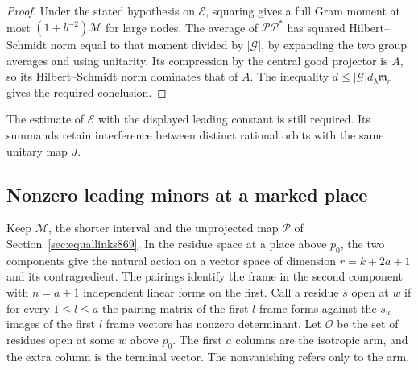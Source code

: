 \documentclass[a4paper,11pt]{article}
\theoremstyle{definition}
\theoremstyle{remark}
\numberwithin{equation}{section}
\begin{document}
\begin{proof}
Under the stated hypothesis on \(\mathcal E\), squaring gives
a full Gram moment at most \((1+b^{-2})\mathcal M\) for large
nodes. The average of \(\mathcal P\mathcal P^*\) has squared
Hilbert--Schmidt norm equal to that moment divided by
\(|\mathcal G|\), by expanding the two group averages and
using unitarity. Its compression by the central good projector
is \(A\), so its Hilbert--Schmidt norm dominates that of \(A\).
The inequality \(d\le|\mathcal G|d_\lambda\mathfrak m_r\) gives
the required conclusion.
\end{proof}

The estimate of \(\mathcal E\) with the displayed leading constant
is still required. Its summands retain interference between distinct
rational orbits with the same unitary map \(J\).
\clearpage

\subsection{Nonzero leading minors at a marked place}
\label{sec:openenergy870}

Keep \(\mathcal M\), the shorter interval and the unprojected
map \(\mathcal P\) of Section~\ref{sec:equallinks869}. In the
residue space at a place above \(p_0\), the two components give
the natural action on a vector space of dimension \(r=k+2a+1\)
and its contragredient. The pairings identify the frame in
the second component with \(n=a+1\) independent linear forms
on the first. Call a residue \(s\) open at \(w\) if for every
\(1\le l\le a\) the pairing matrix of the first \(l\) frame
forms against the \(s_w\)-images of the first \(l\) frame
vectors has nonzero determinant. Let \(\mathcal O\) be the
set of residues open at some \(w\) above \(p_0\). The first
\(a\) columns are the isotropic arm, and the extra column
is the terminal vector. The nonvanishing refers only to the arm.
\end{document}
